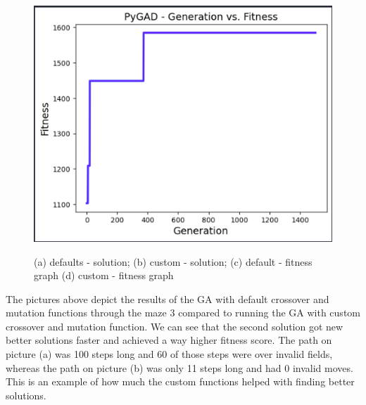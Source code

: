 \documentclass{article}
\begin{document}
\begin{description}
\begin{description}
\begin{figure}[H]
\begin{minipage}{.5\linewidth}
{				\includegraphics[scale=.25]{default_mutation.png}
			}
		 \end{minipage}%
		\begin{minipage}{.5\linewidth}
			\centering
		 \end{minipage}\par\medskip%
		
		\caption{
			(a)  defaults - solution; 
			(b)  custom - solution; 
			(c) default - fitness graph 
			(d)  custom - fitness graph
		}
	\end{figure}
	The pictures above depict the results of the GA with default crossover and mutation functions through the maze 3 compared to running the GA with custom crossover and mutation function. We can see that the second solution got new better solutions faster and achieved a way higher fitness score. The path on picture (a) was 100 steps long and 60 of those steps were over invalid fields, whereas the path on picture (b) was only 11 steps long and had 0 invalid moves.  This is an example of how much the custom functions helped with finding better solutions. 


\end{description}
\end{description}
\end{document}
